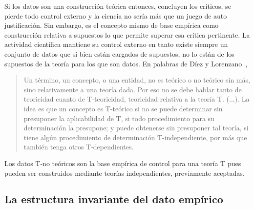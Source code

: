 \documentclass[a4paper,11pt]{book}
\theoremstyle{definition}
\begin{document}

Si los datos son una construcción teórica entonces, concluyen los críticos, se pierde todo control externo y la ciencia no sería más que un juego de auto justificación.
%
Sin embargo, es el concepto mismo de base empírica como construcción relativa a supuestos lo que permite superar esa crítica pertinente.
%
La actividad científica mantiene su control externo en tanto existe siempre un conjunto de datos que si bien están cargados de supuestos, no lo están de los supuestos de la teoría para los que son datos.
%
En palabras de Díez y Lorenzano~\cite{lorenzano2002-concepcionEstructuralista},
%
\begin{quotation}
Un término, un concepto, o una entidad, no es teórico o no teórico sin más, sino relativamente a una teoría dada.
Por eso no se debe hablar tanto de teoricidad cuanto de T-teoricidad, teoricidad relativa a la teoría T. (...).
La idea es que un concepto es T-teórico si no se puede determinar sin presuponer la aplicabilidad de T, si todo procedimiento para su determinación la presupone; y puede obtenerse sin presuponer tal teoría, si tiene algún procedimiento de determinación T-independiente, por más que también tenga otros T-dependientes.
\end{quotation}
%
Los datos T-no teóricos son la base empírica de control para una teoría T pues pueden ser construidos mediante teorías independientes, previamente aceptadas.




\subsection{La estructura invariante del dato empírico}
\end{document}
